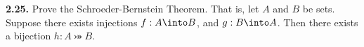 \documentclass{fkbook}
\newenvironment{problem}[1][Problem \thesection.]
{\begin{boxedminipage}{\linewidth}\textbf{#1.}}
{\end{boxedminipage}}
\begin{document}
\begin{problem}[2.25]
  Prove the Schroeder-Bernstein Theorem. That is, let $A$ and $B$ be sets.
  Suppose there exists injections $f : A \into B$, and $g : B \into A$. Then
  there exists a bijection $h : A \bij B$.
\end{problem}


\end{document}
